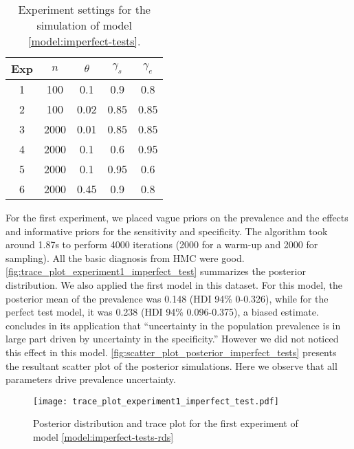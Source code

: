 \begin{table}[!ht]
  \centering
  \caption{\label{table:experiments-imperfect-test}Experiment settings for the
  simulation of model \eqref{model:imperfect-tests}.}
  \begin{tabular}{ccccc}
  \hline
  Exp & $n$ & $\theta$ & $\gamma_s$ & $\gamma_e$ \\ \hline
  \multicolumn{1}{c}{1} & 100 & 0.1 & 0.9 & 0.8 \\
  \multicolumn{1}{c}{2} & 100 & 0.02 & 0.85 & 0.85 \\
  \multicolumn{1}{c}{3} & 2000 & 0.01 & 0.85 & 0.85 \\
  \multicolumn{1}{c}{4} & 2000 & 0.1 & 0.6 & 0.95 \\
  \multicolumn{1}{c}{5} & 2000 & 0.1 & 0.95 & 0.6 \\ 
  \multicolumn{1}{c}{6} & 2000 & 0.45 & 0.9 & 0.8 \\ \hline
  \end{tabular}
\end{table}

For the first experiment, we placed vague priors on the prevalence and the
effects and informative priors for the sensitivity and specificity. The
algorithm took around 1.87s to perform 4000 iterations  (2000 for a warm-up
and 2000 for sampling). All the basic diagnosis from HMC were good. 
\autoref{fig:trace_plot_experiment1_imperfect_test} summarizes the posterior
distribution. We also applied the first model in this dataset. For this model,
the posterior mean of the prevalence was 0.148 (HDI 94\% 0-0.326), while for
the perfect test model, it was 0.238 (HDI 94\% 0.096-0.375), a biased
estimate. \textcite[p. 1271]{gelman2020bayesian} concludes in its application
that ``uncertainty in the population prevalence is in large part driven by
uncertainty in the specificity.'' However we did not noticed this effect in
this model. \autoref{fig:scatter_plot_posterior_imperfect_tests} presents the
resultant scatter plot of the posterior simulations. Here we observe that all
parameters drive prevalence uncertainty. 

\begin{figure}[ht]
  \centering
  \caption{\label{fig:trace_plot_experiment1_imperfect_test}Posterior distribution
  and trace plot for the first experiment of model
  \eqref{model:imperfect-tests-rds}}
  \texttt{[image: trace\_plot\_experiment1\_imperfect\_test.pdf]}
\end{figure}

